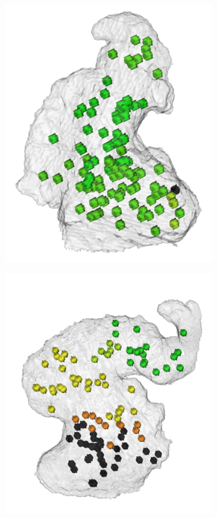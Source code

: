 \documentclass[review]{elsarticle}
\begin{document}
\begin{figure}[t]
\begin{subfigure}[b]{.17\linewidth}
    \includegraphics[width=\textwidth]{fig16_2.png}
    \caption{}
  \end{subfigure}%
  \begin{subfigure}[b]{.18\linewidth}
    \centering
    \includegraphics[width=\textwidth]{fig16_3.png}

\end{subfigure}
\end{figure}
\end{document}
